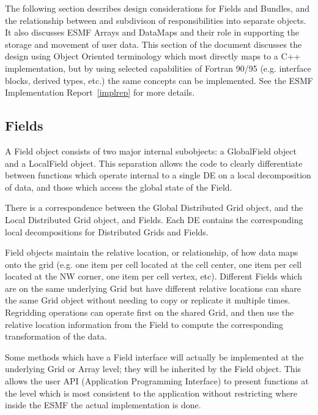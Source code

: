 

The following section describes design considerations for
Fields and Bundles, and the relationship between and subdivison of
responsibilities into separate objects.
It also discusses ESMF Arrays and DataMaps and their
role in supporting the storage and movement of user data.
This section of the document discusses the design using 
Object Oriented terminology which most directly maps 
to a C++ implementation, but by using selected
capabilities of Fortran 90/95 (e.g. interface blocks,
derived types, etc.) the same concepts can be implemented.
See the ESMF Implementation Report~\ref{implrep} for more details.

\subsection{Fields}

A Field object consists of two major internal subobjects: a GlobalField object
and a LocalField object.  This separation allows the code to clearly
differentiate between functions which operate internal to a single DE
on a local decomposition of data, 
and those which access the global state of the Field.  
 
There is a correspondence between the Global Distributed Grid object,
and the Local Distributed Grid object, and Fields.  Each DE contains
the corresponding local decompositions for Distributed Grids and Fields.

Field objects maintain the relative location, or relationship, of
how data maps onto the grid (e.g. one item per cell located at
the cell center, one item per cell located at the NW corner, 
one item per cell vertex, etc).  Different Fields
which are on the same underlying Grid but have different
relative locations
can share the same Grid object without
needing to copy or replicate it multiple times.  Regridding
operations can operate first on the shared Grid, and then
use the relative location information from the Field to compute the
corresponding transformation of the data.

Some methods which have a Field interface will actually be
implemented at the underlying Grid or Array level; they
will be inherited by the Field object.  This allows the user
API (Application Programming Interface) to present functions at
the level which is most consistent to the application without
restricting where inside the ESMF the actual implementation
is done.

